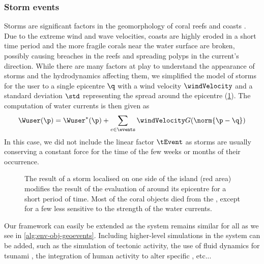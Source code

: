 \subsubsection{Storm events}
Storms are significant factors in the geomorphology of coral reefs \cite{VilaConcejo2016, Oron2023} and coasts \cite{Dominguez2005, Cowart2010}. Due to the extreme wind and wave velocities, coasts are highly eroded in a short time period and the more fragile corals near the water surface are broken, possibly causing breaches in the reefs and spreading polyps in the current's direction. While there are many factors at play to understand the appearance of storms and the hydrodynamics affecting them, we simplified the model of storms for the user to a single epicentre $\q$ with a wind velocity $\windVelocity$ and a standard deviation $\std$ representing the spread around the epicentre (\cref{fig:env-obj-storm-event}). The computation of water currents is then given as
\begin{align*}
    \Wuser(\p) = \Wuser^*(\p) + \sum_{e \in \events} {\windVelocity G(\norm{\p - \q})}
\end{align*}
In this case, we did not include the linear factor $\tEvent$ as storms are usually conserving a constant force for the time of the few weeks or months of their occurrence. 

\begin{figure}
    \caption{The result of a storm localised on one side of the island (red area) modifies the result of the evaluation of  around its epicentre for a short period of time. Most of the coral objects died from the , except for a few  less sensitive to the strength of the water currents.}
    \label{fig:env-obj-storm-event}
\end{figure}

\midConclusion

Our framework can easily be extended as the  system remains similar for all  as we see in \cref{alg:env-obj-geoevents}. Including higher-level simulations in the  system can be added, such as the simulation of tectonic activity, the use of fluid dynamics for tsunami , the integration of human activity to alter specific , etc...

